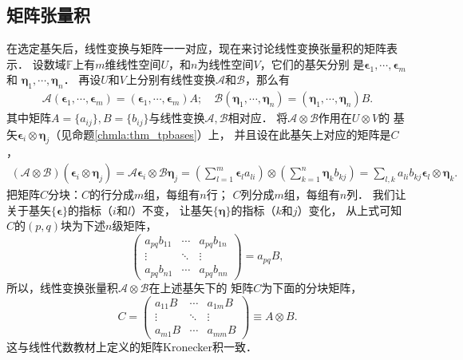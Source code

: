 \subsection{矩阵张量积}
在选定基矢后，线性变换与矩阵一一对应，现在来讨论线性变换张量积的矩阵表示．
设数域$\mathbb{F}$上有$m$维线性空间$U$，和$n$为线性空间$V$，它们的基矢分别
是$\boldsymbol{\epsilon}_1, \cdots, \boldsymbol{\epsilon}_m$和
$\boldsymbol{\eta}_1, \cdots, \boldsymbol{\eta}_n$．
再设$U$和$V$上分别有线性变换$\mathcal{A}$和$\mathcal{B}$，那么有
\begin{align}
    \mathcal{A}(\boldsymbol{\epsilon}_1, \cdots, \boldsymbol{\epsilon}_m)
      = (\boldsymbol{\epsilon}_1, \cdots, \boldsymbol{\epsilon}_m) {A};  \quad
    \mathcal{B}(\boldsymbol{\eta}_1, \cdots, \boldsymbol{\eta}_n)
      = (\boldsymbol{\eta}_1, \cdots, \boldsymbol{\eta}_n) {B}.
\end{align}
其中矩阵${A}=\{a_{ij}\},{B}=\{b_{ij}\}$与线性变换$\mathcal{A},\mathcal{B}$相对应．
将$\mathcal{A}\otimes \mathcal{B}$作用在$U\otimes V$的
基矢$\boldsymbol{\epsilon}_i\otimes \boldsymbol{\eta}_j$（见命题\ref{chmla:thm_tpbases}）上，
并且设在此基矢上对应的矩阵是${C}$，
\begin{align*}
    (\mathcal{A}\otimes \mathcal{B}) (\boldsymbol{\epsilon}_i\otimes \boldsymbol{\eta}_j)
    =\mathcal{A} \boldsymbol{\epsilon}_i \otimes \mathcal{B}\boldsymbol{\eta}_j
    =\left(\sum_{l=1}^{m}\boldsymbol{\epsilon}_l a_{li}\right) \otimes
     \left(\sum_{k=1}^{n}\boldsymbol{\eta}_k b_{kj}\right)
    = \sum_{l,k}a_{li}b_{kj} \boldsymbol{\epsilon}_l \otimes\boldsymbol{\eta}_k .
\end{align*}
把矩阵${C}$分块：${C}$的行分成$m$组，每组有$n$行；
${C}$列分成$m$组，每组有$n$列．
我们让关于基矢$\{\boldsymbol{\epsilon}\}$的指标（$i$和$l$）不变，
让基矢$\{\boldsymbol{\eta}\}$的指标（$k$和$j$）变化，
从上式可知${C}$的$(p,q)$块为下述$n$级矩阵，
\begin{equation}
    \begin{pmatrix}
       a_{pq} b_{11}  &\cdots &a_{pq} b_{1n} \\
         \vdots &  \ddots & \vdots \\
       a_{pq} b_{n1}  &\cdots &a_{pq} b_{nn}
    \end{pmatrix}
     = a_{pq}{B},
\end{equation}
所以，线性变换张量积$\mathcal{A}\otimes \mathcal{B}$在上述基矢下的
矩阵${C}$为下面的分块矩阵，
\begin{equation}\label{chmla:eqn_KroneckerProduct}
    {C} =
    \begin{pmatrix}
        a_{11}{B} &\cdots &a_{1m}{B} \\
        \vdots &  \ddots & \vdots \\
        a_{m1}{B}  &\cdots &a_{mm}{B}
    \end{pmatrix}
    \equiv {A}\otimes {B} .
\end{equation}
这与线性代数教材上定义的矩阵Kronecker积一致．

